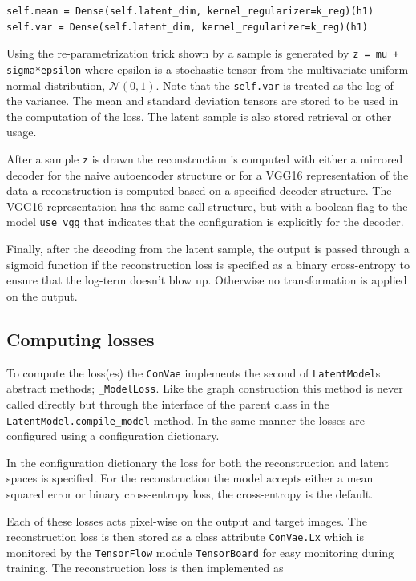 \begin{lstlisting}[language=iPython]
self.mean = Dense(self.latent_dim, kernel_regularizer=k_reg)(h1)
self.var = Dense(self.latent_dim, kernel_regularizer=k_reg)(h1)
\end{lstlisting}

 Using the re-parametrization trick shown by \citet{Kingma2013} a sample is generated by \lstinline{z = mu + sigma*epsilon} where epsilon is a stochastic tensor from the multivariate uniform normal distribution, $\mathcal{N}(0, 1)$. Note that the \lstinline{self.var} is treated as the log of the variance. The mean and standard deviation tensors are stored to be used in the computation of the loss. The latent sample is also stored retrieval or other usage. 

After a sample \lstinline{z} is drawn the reconstruction is computed with either a mirrored decoder for the naive autoencoder structure or for a VGG16 representation of the data a reconstruction is computed based on a specified decoder structure. The VGG16 representation has the same call structure, but with a boolean flag to the model \lstinline{use_vgg} that indicates that the configuration is explicitly for the decoder. 

Finally, after the decoding from the latent sample, the output is passed through a sigmoid function if the reconstruction loss is specified as a binary cross-entropy to ensure that the log-term doesn't blow up. Otherwise no transformation is applied on the output. 

\subsection{Computing losses}

To compute the loss(es) the \lstinline{ConVae} implements the second of \lstinline{LatentModel}s abstract methods; \lstinline{_ModelLoss}. Like the graph construction this method is never called directly but through the interface of the parent class in the \lstinline{LatentModel.compile_model} method. In the same manner the losses are configured using a configuration dictionary. 

In the configuration dictionary the loss for both the reconstruction and latent spaces is specified. For the reconstruction the model accepts either a mean squared error or binary cross-entropy loss, the cross-entropy is the default. 

Each of these losses acts pixel-wise on the output and target images. The reconstruction loss is then stored as a class attribute \lstinline{ConVae.Lx} which is monitored by the \lstinline{TensorFlow} module \lstinline{TensorBoard} for easy monitoring during training. The reconstruction loss is then implemented as 

